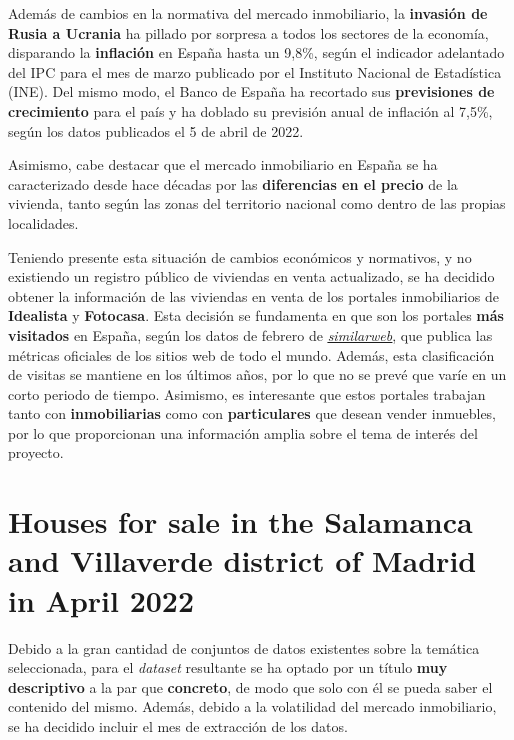 \documentclass[12pt]{article}
\begin{document}
Además de cambios en la normativa del mercado inmobiliario, la \textbf{invasión de Rusia a Ucrania} ha pillado por sorpresa a todos los sectores de la economía, disparando la \textbf{inflación} en España hasta un 9,8\%, según el indicador adelantado del IPC para el mes de marzo publicado por el Instituto Nacional de Estadística (INE). Del mismo modo, el Banco de España ha recortado sus \textbf{previsiones de crecimiento} para el país y ha doblado su previsión anual de inflación al 7,5\%, según los datos publicados el 5 de abril de 2022.

Asimismo, cabe destacar que el mercado inmobiliario en España se ha caracterizado desde hace décadas por las \textbf{diferencias en el precio} de la vivienda, tanto según las zonas del territorio nacional como dentro de las propias localidades. 

Teniendo presente esta situación de cambios económicos y normativos, y no existiendo un registro público de viviendas en venta actualizado, se ha decidido obtener la información de las viviendas en venta de los portales inmobiliarios de \textbf{Idealista} y \textbf{Fotocasa}. Esta decisión se fundamenta en que son los portales \textbf{más visitados} en España, según los datos de febrero de \href{https://www.similarweb.com/top-websites/spain/category/business-and-consumer-services/real-estate/}{\textit{\underline{similarweb}}}, que publica las métricas oficiales de los sitios web de todo el mundo. Además, esta clasificación de visitas se mantiene en los últimos años, por lo que no se prevé que varíe en un corto periodo de tiempo. Asimismo, es interesante que estos portales trabajan tanto con \textbf{inmobiliarias} como con \textbf{particulares} que desean vender inmuebles, por lo que proporcionan una información amplia sobre el tema de interés del proyecto.


\vspace{-1.5em}\section{Houses for sale in the Salamanca and Villaverde district of Madrid in April 2022}\vspace{-1.0em}

Debido a la gran cantidad de conjuntos de datos existentes sobre la temática seleccionada, para el \textit{dataset} resultante se ha optado por un título \textbf{muy descriptivo} a la par que \textbf{concreto}, de modo que solo con él se pueda saber el contenido del mismo. Además, debido a la volatilidad del mercado inmobiliario, se ha decidido incluir el mes de extracción de los datos.
\end{document}
